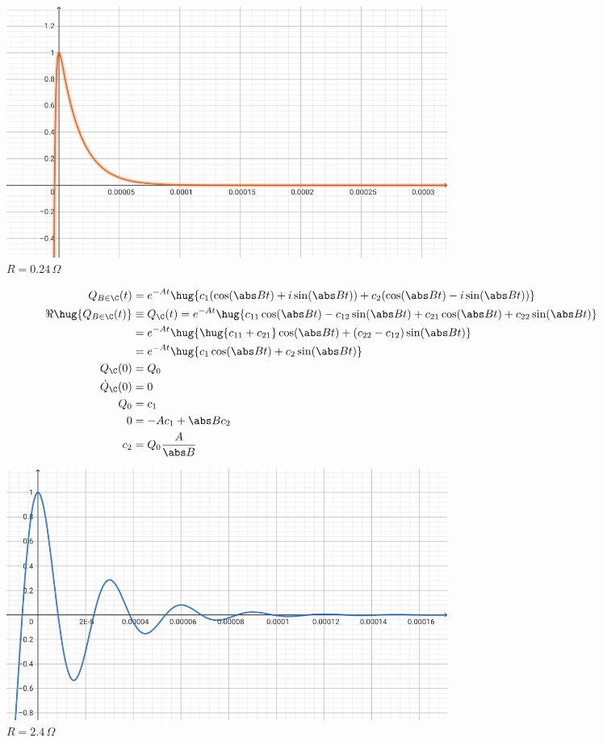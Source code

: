 \documentclass[11pt]{article}
\begin{document}
\begin{figure}[h]
    \centering
    \includegraphics[width=0.7\textwidth]{0.24.png}
    \caption{\(R=0.24 \,\Omega\)}
\end{figure}
\begin{align*}
    Q_{B\in\C}(t) &= e^{-A t} \hug{c_1 (\cos(\abs B t) + i\sin(\abs B t)) + c_2 (\cos(\abs B t) - i\sin(\abs B t))}\\
    \Re \hug{Q_{B\in\C}(t)} & \equiv Q_\C(t)= e^{-A t} \hug{c_{11}\cos(\abs B t) - c_{12}\sin(\abs B t) + c_{21} \cos(\abs B t) + c_{22}\sin(\abs B t)}\\
    &= e^{-A t} \hug{\hug{c_{11} + c_{21}}\cos(\abs B t) + (c_{22}- c_{12})\sin(\abs B t)}\\
    &= e^{-A t} \hug{c_1\cos(\abs B t) + c_2\sin(\abs B t)}\\
    Q_\C(0)&= Q_0\\
    \dot Q_\C(0)&= 0\\
    Q_0 &= c_1\\
    0 &= -A c_1 + \abs B c_2\\
    c_2 &= Q_0 \frac{A}{\abs B}
\end{align*}

\begin{figure}[h]
    \centering
    \includegraphics[width=0.7\textwidth]{2.4.png}
    \caption{\(R=2.4 \,\Omega\)}
\end{figure}
\end{document}
